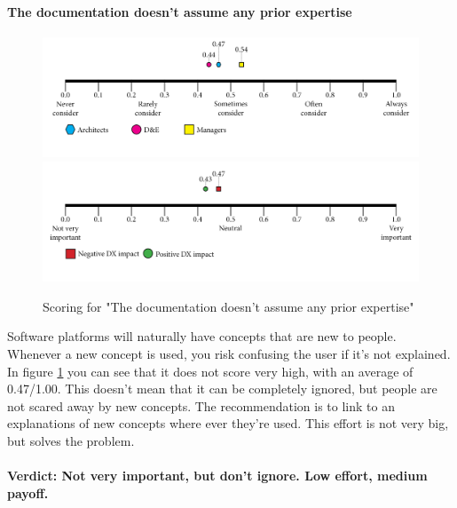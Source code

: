 \documentclass{article}
\begin{document}
\paragraph{The documentation doesn’t assume any prior expertise}
\begin{figure}[H]
\centering
\includegraphics[width=\linewidth]{scorelines/aspect5.png}
\includegraphics[width=\linewidth]{dxscorelines/dxaspect5.png}
\caption{Scoring for "The documentation doesn’t assume any prior expertise"}
\label{fig:aspect5}
\end{figure}
Software platforms will naturally have concepts that are new to people. Whenever a new concept is used, you risk confusing the user if it's not explained. In figure \ref{fig:aspect5} you can see that it does not score very high, with an average of 0.47/1.00. This doesn't mean that it can be completely ignored, but people are not scared away by new concepts. The recommendation is to link to an explanations of new concepts where ever they're used. This effort is not very big, but solves the problem. \\ \\
\textbf{Verdict: Not very important, but don't ignore. Low effort, medium payoff.}
\end{document}
